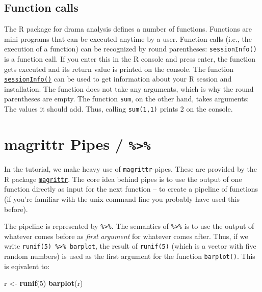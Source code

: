 \documentclass[]{book}
\newenvironment{Shaded}{\begin{snugshade}}{\end{snugshade}}
\newcommand{\DecValTok}[1]{\textcolor[rgb]{0.00,0.00,0.81}{#1}}
\newcommand{\KeywordTok}[1]{\textcolor[rgb]{0.13,0.29,0.53}{\textbf{#1}}}
\newcommand{\NormalTok}[1]{#1}
\newcommand{\StringTok}[1]{\textcolor[rgb]{0.31,0.60,0.02}{#1}}
\begin{document}
\hypertarget{function-calls}{%
\subsection{Function calls}\label{function-calls}}

The R package for drama analysis defines a number of functions. Functions are mini programs that can be executed anytime by a user. Function calls (i.e., the execution of a function) can be recognized by round parentheses: \texttt{sessionInfo()} is a function call. If you enter this in the R console and press enter, the function gets executed and its return value is printed on the console. The function \href{https://www.rdocumentation.org/packages/utils/versions/3.6.0/topics/sessionInfo}{\texttt{sessionInfo()}} can be used to get information about your R session and installation. The function does not take any arguments, which is why the round parentheses are empty. The function \texttt{sum}, on the other hand, takes arguments: The values it should add. Thus, calling \texttt{sum(1,1)} prints 2 on the console.

\hypertarget{magrittr}{%
\section{\texorpdfstring{magrittr Pipes / \texttt{\%\textgreater{}\%}}{magrittr Pipes / \%\textgreater{}\%}}\label{magrittr}}

In the tutorial, we make heavy use of \texttt{magrittr}-pipes. These are provided by the R package \href{https://cran.r-project.org/web/packages/magrittr/vignettes/magrittr.html}{\texttt{magrittr}}. The core idea behind pipes is to use the output of one function directly as input for the next function -- to create a pipeline of functions (if you're familiar with the unix command line you probably have used this before).

The pipeline is represented by \texttt{\%\textgreater{}\%}. The semantics of \texttt{\%\textgreater{}\%} is to use the output of whatever comes before as \emph{first argument} for whatever comes after. Thus, if we write \texttt{runif(5)\ \%\textgreater{}\%\ barplot}, the result of \texttt{runif(5)} (which is a vector with five random numbers) is used as the first argument for the function \texttt{barplot()}. This is eqivalent to:

\begin{Shaded}
\begin{Highlighting}[]
\NormalTok{r <-}\StringTok{ }\KeywordTok{runif}\NormalTok{(}\DecValTok{5}\NormalTok{)}
\KeywordTok{barplot}\NormalTok{(r)}
\end{Highlighting}
\end{Shaded}
\end{document}
